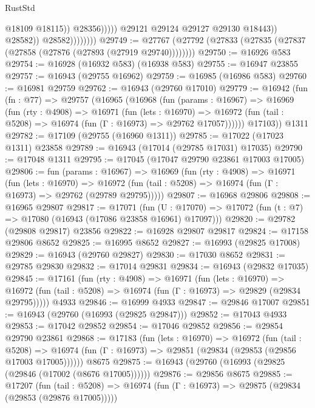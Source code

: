 \begin{lexlean}{RustStd}
\begin{coremodule}
                                          @18109
                                          @18115))
                                      @28356)))))
                            @29121
                            @29124
                            @29127
                            @29130
                            @18443))
                        @28582))
                    @28582))))))))
@29749 := @27767 (@27792 (@27833 (@27835 (@27837 (@27858 (@27876 (@27893 (@27919 @29740))))))))
@29750 := @16926 @583
@29754 := @16928 (@16932 @583) (@16938 @583)
@29755 := @16947 @23855
@29757 := @16943 (@29755 @16962)
@29759 := @16985 (@16986 @583)
@29760 := @16981 @29759
@29762 := @16943 (@29760 @17010)
@29779 := @16942
    (fun (fn : @77) =>
    @29757
      (@16965
        (@16968
          (fun (params : @16967) =>
          @16969
            (fun (rty : @4908) =>
            @16971
              (fun (lets : @16970) =>
              @16972 (fun (tail : @5208) => @16974 (fun (Γ : @16973) => @29762 @17057))))))
        @17103))
    @1311
@29782 := @17109 (@29755 (@16960 @1311))
@29785 := @17022 (@17023 @1311) @23858
@29789 := @16943 (@17014 (@29785 @17031) @17035)
@29790 := @17048 @1311
@29795 := @17045 (@17047 @29790 @23861 @17003 @17005)
@29806 := fun (params : @16967) =>
  @16969
    (fun (rty : @4908) =>
    @16971
      (fun (lets : @16970) =>
      @16972 (fun (tail : @5208) => @16974 (fun (Γ : @16973) => @29762 (@29789 @29795)))))
@29807 := @16968 @29806
@29808 := @16965 @29807
@29817 := @17071
    (fun (U : @17070) => @17072 (fun (t : @7) => @17080 (@16943 (@17086 @23858 @16961) @17097)))
@29820 := @29782 (@29808 @29817) @23856
@29822 := @16928 @29807 @29817
@29824 := @17158 @29806 @8652
@29825 := @16995 @8652
@29827 := @16993 (@29825 @17008)
@29829 := @16943 (@29760 @29827)
@29830 := @17030 @8652
@29831 := @29785 @29830
@29832 := @17014 @29831
@29834 := @16943 (@29832 @17035)
@29845 := @17161
    (fun (rty : @4908) =>
    @16971
      (fun (lets : @16970) =>
      @16972 (fun (tail : @5208) => @16974 (fun (Γ : @16973) => @29829 (@29834 @29795)))))
    @4933
@29846 := @16999 @4933
@29847 := @29846 @17007
@29851 := @16943 (@29760 (@16993 (@29825 @29847)))
@29852 := @17043 @4933
@29853 := @17042 @29852
@29854 := @17046 @29852
@29856 := @29854 @29790 @23861
@29868 := @17183
    (fun (lets : @16970) =>
    @16972
      (fun (tail : @5208) =>
      @16974 (fun (Γ : @16973) => @29851 (@29834 (@29853 (@29856 @17003 @17005))))))
    @8675
@29875 := @16943 (@29760 (@16993 (@29825 (@29846 (@17002 (@8676 @17005))))))
@29876 := @29856 @8675
@29885 := @17207
    (fun (tail : @5208) => @16974 (fun (Γ : @16973) => @29875 (@29834 (@29853 (@29876 @17005)))))

\end{coremodule}
\end{lexlean}
